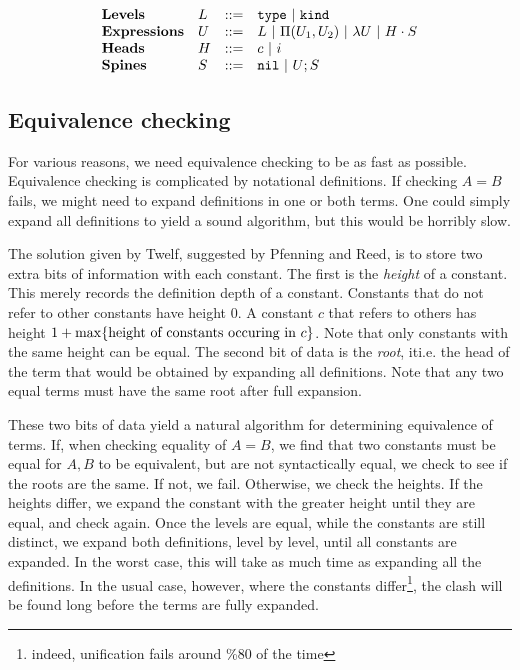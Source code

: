 \documentclass[11pt,twoside]{article}
\begin{document}
$$
\begin{array}{llll}
\mathbf{Levels} & L & ::= & \mathtt{type} \ |\  \mathtt{kind} \\
\mathbf{Expressions} & U & ::= & L \ |\  \Pi(U_1,U_2) \ |\  \lambda U \ |\  H\cdot S \\
\mathbf{Heads} & H & ::= & c \ |\  i\\
\mathbf{Spines} & S & ::= & \mathtt{nil} \ |\  U;S\\
\end{array} 
$$


\subsection{Equivalence checking} \label{main:equiv}
  For various reasons, we need equivalence checking to
be as fast as possible.  Equivalence checking is complicated
by notational definitions.  If checking $A=B$ fails, we might need
to expand definitions in one or both terms.  One could simply
expand all definitions to yield a sound algorithm, but this would
be horribly slow.  

  The solution given by Twelf, suggested by 
Pfenning and Reed, is to store two extra bits of information 
with each constant.  The first is the \emph{height} of a constant.
This merely records the definition depth of a constant.  Constants that
do not refer to other constants have height 0.  A constant $c$ that refers
to others has height $1 + \max\{\mbox{height of constants occuring in } c\}$.
Note that only constants with the same height can be equal.  
The second bit of data is the \emph{root}, it{i.e.} the head of the term that would be obtained by 
expanding all definitions.  Note that any two equal terms must have the
same root after full expansion. 

These two bits of data yield a natural algorithm for determining 
equivalence of terms.  If, when checking equality of $A=B$,
we find that two constants must be equal for $A,B$ to
be equivalent, but are not syntactically equal, 
we check to see if the roots are the same.
If not, we fail.  Otherwise, we check the heights.  If the heights
differ, we expand the constant with the greater height until 
they are equal, and check again.  Once the levels
are equal, while the constants are still distinct, we 
expand both definitions, level by level, until all constants
are expanded.  In the worst case, this will take as much time
as expanding all the definitions.  In the usual case, however,
where the constants differ\footnote{indeed, unification fails
around \%80 of the time}, the clash will be found long before
the terms are fully expanded.  
\end{document}
